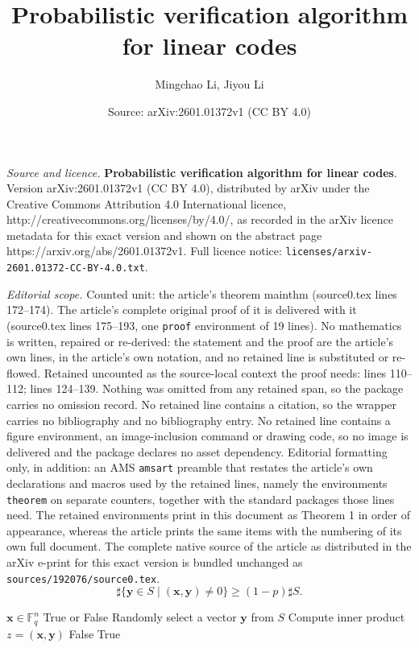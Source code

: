 \documentclass[10pt,a4paper]{amsart}
\title{\LARGE \textbf{Probabilistic verification algorithm for linear codes}}
\author{Mingchao Li, Jiyou Li}
\date{Source: arXiv:2601.01372v1 (CC BY 4.0)}
\begin{document}
\maketitle

\noindent\emph{Source and licence.} \LARGE \textbf{Probabilistic verification algorithm for linear codes}. Version arXiv:2601.01372v1 (CC BY 4.0), distributed by arXiv under the Creative Commons Attribution 4.0 International licence, http://creativecommons.org/licenses/by/4.0/, as recorded in the arXiv licence metadata for this exact version and shown on the abstract page https://arxiv.org/abs/2601.01372v1. Full licence notice: \texttt{licenses/arxiv-2601.01372-CC-BY-4.0.txt}.\par\smallskip

\noindent\textit{Editorial scope.} Counted unit: the article's theorem mainthm (source0.tex lines 172--174). The article's complete original proof of it is delivered with it (source0.tex lines 175--193, one \texttt{proof} environment of 19 lines). No mathematics is written, repaired or re-derived: the statement and the proof are the article's own lines, in the article's own notation, and no retained line is substituted or re-flowed.  Retained uncounted as the source-local context the proof needs: lines 110--112; lines 124--139.  Nothing was omitted from any retained span, so the package carries no omission record.  No retained line contains a citation, so the wrapper carries no bibliography and no bibliography entry.  No retained line contains a figure environment, an image-inclusion command or drawing code, so no image is delivered and the package declares no asset dependency.  Editorial formatting only, in addition: an AMS \texttt{amsart} preamble that restates the article's own declarations and macros used by the retained lines, namely the environments \texttt{theorem} on separate counters, together with the standard packages those lines need.  The retained environments print in this document as Theorem 1 in order of appearance, whereas the article prints the same items with the numbering of its own full document.  The complete native source of the article as distributed in the arXiv e-print for this exact version is bundled unchanged as \texttt{sources/192076/source0.tex}.
    \begin{equation}
        \sharp\{\mathbf{y}\in S\;|\; (\mathbf{x},\mathbf{y})\not = 0\}\ge (1-p)\sharp S.\label{1}
    \end{equation}

\begin{algorithm}[H]
\caption{DetermineCodeword}
\label{alg:deter}
\begin{algorithmic}[1]
\Require $\mathbf{x}\in \mathbb{F}_q^n$
\Ensure True or False 
    \State Randomly select a vector $\mathbf{y}$ from $S$
    \State Compute inner product $z = (\mathbf{x}, \mathbf{y})$
        \State \Return False
    \EndIf
\EndFor
\State \Return True
\end{algorithmic}
\end{algorithm}
\end{document}
